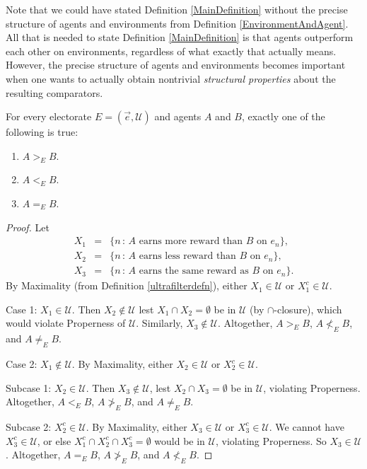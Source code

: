 \documentclass[twoside,11pt]{article}
\begin{document}
Note that we could have stated Definition \ref{MainDefinition} without the
precise structure of agents and environments from Definition \ref{EnvironmentAndAgent}.
All that is needed to state Definition \ref{MainDefinition} is that agents
outperform each other on environments, regardless of what exactly that actually means.
However, the precise structure of agents and environments becomes important when one
wants to actually obtain nontrivial \emph{structural properties} about the resulting
comparators.

\begin{lemma}
\label{firsteasylemma}
    For every electorate $E=(\vec{e},\mathscr U)$ and agents $A$ and $B$, exactly one of the following is true:
    \begin{enumerate}
        \item $A>_{E}B$.
        \item $A<_{E}B$.
        \item $A=_{E}B$.
    \end{enumerate}
\end{lemma}

\begin{proof}
    Let
    \begin{eqnarray*}
        X_1 &=& \{n\,:\,\mbox{$A$ earns more reward than $B$ on $e_n$}\},\\
        X_2 &=& \{n\,:\,\mbox{$A$ earns less reward than $B$ on $e_n$}\},\\
        X_3 &=& \{n\,:\,\mbox{$A$ earns the same reward as $B$ on $e_n$}\}.
    \end{eqnarray*}
    By Maximality (from Definition \ref{ultrafilterdefn}),
    either $X_1\in \mathscr U$ or $X_1^c\in\mathscr U$.

    Case 1: $X_1\in\mathscr U$. Then $X_2\not\in\mathscr U$ lest $X_1\cap X_2=\emptyset$ be in
    $\mathscr U$ (by $\cap$-closure), which would violate Properness of $\mathscr U$.
    Similarly, $X_3\not\in\mathscr U$. Altogether, $A>_{E}B$,
    $A\not<_{E}B$, and $A\neq_{E}B$.

    Case 2: $X_1\not\in\mathscr U$.
    By Maximality, either $X_2\in\mathscr U$ or $X_2^c\in\mathscr U$.

    Subcase 1: $X_2\in\mathscr U$. Then $X_3\not\in\mathscr U$, lest $X_2\cap X_3=\emptyset$
    be in $\mathscr U$, violating Properness. Altogether, $A<_{E}B$,
    $A\not>_{E}B$, and $A\neq_{E}B$.

    Subcase 2: $X_2^c\in\mathscr U$. By Maximality, either $X_3\in\mathscr U$ or
    $X_3^c\in\mathscr U$. We cannot have $X_3^c\in\mathscr U$, or else
    $X_1^c\cap X_2^c\cap X_3^c=\emptyset$
    would be in $\mathscr U$, violating Properness. So $X_3\in\mathscr U$.
    Altogether, $A=_{E}B$, $A\not>_{E}B$, and $A\not<_{E}B$.
\end{proof}
\end{document}

